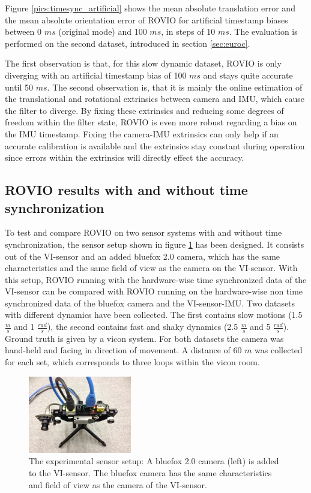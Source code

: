 Figure \ref{pics:timesync_artificial} shows the mean absolute translation error and the mean absolute orientation error of ROVIO for artificial timestamp biases between 0 $ms$ (original mode) and 100 $ms$, in steps of 10 $ms$. The evaluation is performed on the second dataset, introduced in section \ref{sec:euroc}. 

The first observation is that, for this slow dynamic dataset, ROVIO is only diverging with an artificial timestamp bias of 100 $ms$ and stays quite accurate until 50 $ms$. The second observation is, that it is mainly the online estimation of the translational and rotational extrinsics between camera and IMU, which cause the filter to diverge. By fixing these extrinsics and reducing some degrees of freedom within the filter state, ROVIO is even more robust regarding a bias on the IMU timestamp. Fixing the camera-IMU extrinsics can only help if an accurate calibration is available and the extrinsics stay constant during operation since errors within the extrinsics will directly effect the accuracy.



\subsection{ROVIO results with and without time synchronization}
\label{sec:timesync_real}

To test and compare ROVIO on two sensor systems with and without time synchronization, the sensor setup shown in figure \ref{pics:vi_bluefox} has been designed. It consists out of the VI-sensor and an added bluefox 2.0 camera, which has the same characteristics and the same field of view as the camera on the VI-sensor. With this setup, ROVIO running with the hardware-wise time synchronized data of the VI-sensor can be compared with ROVIO running on the hardware-wise non time synchronized data of the bluefox camera and the VI-sensor-IMU. Two datasets with different dynamics have been collected. The first contains slow motions (1.5 $\frac{m}{s}$ and 1 $\frac{rad}{s}$), the second contains fast and shaky dynamics (2.5 $\frac{m}{s}$ and 5 $\frac{rad}{s}$). Ground truth is given by a vicon system. For both datasets the camera was hand-held and facing in direction of movement. A distance of 60 $m$ was collected for each set, which corresponds to three loops within the vicon room. \\

\begin{figure}[h]
   \centering
   \includegraphics[width=0.4\textwidth]{images/vi_bluefox.JPG}
   \caption{The experimental sensor setup: A bluefox 2.0 camera (left) is added to the VI-sensor. The bluefox camera has the same characteristics and field of view as the camera of the VI-sensor.}
   \label{pics:vi_bluefox}
\end{figure}

